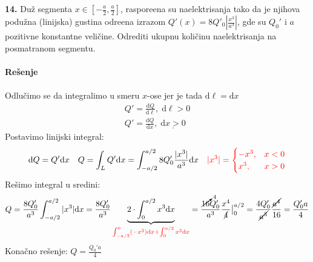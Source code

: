 \clearpage

\textbf{\Large 14.} Du\v{z} segmenta $x\in\left[-\frac{a}{2}, \frac{a}{2}\right]$, raspore\dj{}ena su naelektrisanja tako da je njihova podu\v{z}na (linijska) gustina odre\dj{}ena izrazom $Q'(x) = 8 Q'_0\left|\frac{x^3}{a^3}\right|$, gde su $Q_0'$ i $a$ pozitivne konstantne veli\v{c}ine. Odrediti ukupnu koli\v{c}inu naelektrisanja na posmatranom segmentu.
\\\\
\textbf{\Large Re\v{s}enje}\\

\\
Odlu\v{c}imo se da integralimo u smeru $x$-ose jer je tada $\mathrm d\ell = \mathrm d x$
\begin{align*}
    Q' = \frac{\mathrm d Q}{\mathrm d\ell},\; \mathrm d \ell > 0\\
    Q' = \frac{\mathrm d Q}{\mathrm d x},\; \underline{\mathrm d x > 0}
\end{align*}
Postavimo linijski integral:
\begin{align*}
    \mathrm dQ = Q'\mathrm dx 
    && Q = \int_L Q'\mathrm dx = \int_{-a/2}^{a/2} 8Q_0'\frac{|x^3|}{a^3}\mathrm dx
    && {\color{red} |x^3| = \begin{cases}
        -x^3, & x < 0\\
        x^3, & x > 0
    \end{cases}}
\end{align*}
Re\v{s}imo integral u sredini:
\begin{align*}
Q = \frac{8Q_0'}{a^3}\int_{-a/2}^{a/2} |x^3|\mathrm d x 
= \frac{8 Q_0'}{a^3} \underbrace{2\cdot\int_0^{a/2} x^3\mathrm d x}_{\color{red}\int_{-a/2}^0  (-x^3)\mathrm dx + \int_0^{a/2} x^3\mathrm d x} = \frac{\cancelto{4}{16}Q_0'}{a^3}\frac{x^4}{\cancel{4}}\big|_0^{a/2} = \frac{4Q_0'}{\cancel{a^3}}\frac{\cancel{a^4}}{16} = \frac{Q_0' a}{4}
\end{align*}
Kona\v{c}no re\v{s}enje: $\boxed{Q = \frac{Q_0' a}{4}}$
